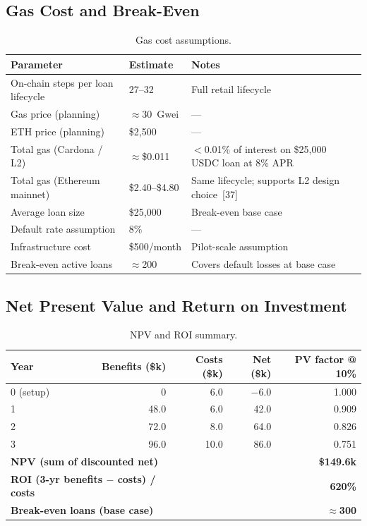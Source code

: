\subsection{Gas Cost and Break-Even}
\label{sec:gas-cost}

\begin{table}[H]
\centering
\caption[Gas cost assumptions]{Gas cost assumptions.}
\label{tab:gas-cost}
\begin{tabular}{p{4.2cm}p{2.8cm}p{6.8cm}}
\toprule
\tableheadcolor
\textbf{Parameter} & \textbf{Estimate} & \textbf{Notes} \\
\midrule
On-chain steps per loan lifecycle & 27--32 & Full retail lifecycle \\
Gas price (planning) & ${\approx}$30~Gwei & --- \\
ETH price (planning) & \$2{,}500 & --- \\
Total gas (Cardona / L2) & ${\approx}$\$0.011 & $<$0.01\% of interest on \$25{,}000 USDC loan at 8\% APR \\
Total gas (Ethereum mainnet) & \$2.40--\$4.80 & Same lifecycle; supports L2 design choice~[37] \\
Average loan size & \$25{,}000 & Break-even base case \\
Default rate assumption & 8\% & --- \\
Infrastructure cost & \$500/month & Pilot-scale assumption \\
Break-even active loans & ${\approx}$200 & Covers default losses at base case \\
\bottomrule
\end{tabular}
\end{table}

\subsection{Net Present Value and Return on Investment}
\label{sec:npv-roi}

\begin{table}[H]
\centering
\caption[NPV and ROI summary]{NPV and ROI summary.}
\label{tab:npv-roi}
\small
\begin{tabular}{@{}lrrrr@{}}
\toprule
\tableheadcolor
\textbf{Year} & \textbf{Benefits (\$k)} & \textbf{Costs (\$k)} & \textbf{Net (\$k)} & \textbf{PV factor @ 10\%} \\
\midrule
0 (setup) & 0 & 6.0 & $-$6.0 & 1.000 \\
1 & 48.0 & 6.0 & 42.0 & 0.909 \\
2 & 72.0 & 8.0 & 64.0 & 0.826 \\
3 & 96.0 & 10.0 & 86.0 & 0.751 \\
\midrule
\multicolumn{2}{l}{\textbf{NPV (sum of discounted net)}} & & \multicolumn{2}{r}{\textbf{\$149.6k}} \\
\multicolumn{2}{l}{\textbf{ROI (3-yr benefits $-$ costs) / costs}} & & \multicolumn{2}{r}{\textbf{620\%}} \\
\multicolumn{2}{l}{\textbf{Break-even loans (base case)}} & & \multicolumn{2}{r}{\textbf{$\approx$300}} \\
\bottomrule
\end{tabular}
\end{table}



